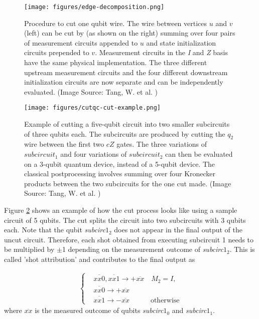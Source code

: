 \begin{figure}[htbp]
    \centering
    \texttt{[image: figures/edge-decomposition.png]}
    \caption{Procedure to cut one qubit wire. The wire between vertices $u$ and $v$ (left) can be cut by (as shown on the right) summing over four pairs of measurement circuits appended to $u$ and state initialization circuits prepended to $v$. Measurement circuits in the \emph{I} and \emph{Z} basis have the same physical implementation. The three different upstream measurement circuits and the four different downstream initialization circuits are now separate and can be independently evaluated. (Image Source: Tang, W. et al. \cite{tang2021cutqc}) }
    \label{fig:edge-decomposition}
\end{figure}


\begin{figure}[htbp]
    \centering
    \texttt{[image: figures/cutqc-cut-example.png]}
    \caption{Example of cutting a five-qubit circuit into two smaller subcircuits of three qubits each. The subcircuits are produced by cutting the $q_2$ wire between the first two $cZ$ gates. The three variations of $subcircuit_1$ and four variations of $subcircuit_2$ can then be evaluated on a 3-qubit quantum device, instead of a 5-qubit device. The classical postprocessing involves summing over four Kronecker products between the two subcircuits for the one cut made. (Image Source: Tang, W. et al. \cite{tang2021cutqc}) }
    \label{fig:cut-example}
\end{figure}

Figure \ref{fig:cut-example} shows an example of how the cut process looks like using a sample circuit of 5 qubits. The cut splits the circuit into two subcircuits with 3 qubits each. Note that the qubit \textit{subcirc}$1_2$ does not appear in the final output of the uncut circuit. Therefore, each shot obtained from executing subcircuit 1 needs to be multiplied by $\pm$1 depending on the measurement outcome of \textit{subcirc}$1_2$. This is called 'shot attribution' and contributes to the final output as

\begin{equation} \label{eq:3.7}
\begin{split}
    \begin{cases}
        & \overline{xx0},\overline{xx1} \rightarrow +\overline{xx} \quad M_2 = I, \\
        & \overline{xx0} \rightarrow +\overline{xx} \\
        & \overline{xx1} \rightarrow -\overline{xx} \quad \quad \quad \text{otherwise}
    \end{cases}
\end{split}
\end{equation}
where $\overline{xx}$ is the measured outcome of qubits \textit{subcirc}$1_0$ and \textit{subcirc}$1_1$.

